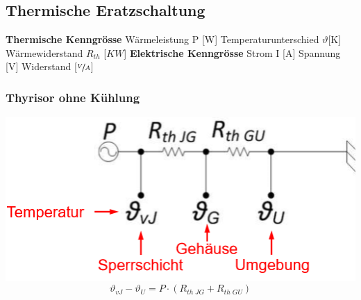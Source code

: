 \subsection{Thermische Eratzschaltung}
\begin{multicols}{3}
    \begin{minipage}{\linewidth}
        \textbf{Thermische Kenngrösse}\newline
        Wärmeleistung P [W]\newline
        Temperaturunterschied $ \vartheta $[K]\newline
        Wärmewiderstand $ R_{th} $ [${K}{W}$]\newline
        \textbf{Elektrische Kenngrösse}\newline
        Strom I  [A]\newline
        Spannung [V]\newline
        Widerstand [$\nicefrac{V}{A}$]\newline
    \end{minipage}

	\begin{minipage}{\linewidth}
		\subsubsection{Thyrisor ohne Kühlung}
		\includegraphics[width=\linewidth]{images/thyrOK}
		\[ \vartheta_{vJ}-\vartheta_U=P \cdot (R_{th\; JG}+R_{th\; GU}) \]		
	\end{minipage}

	\begin{minipage}{\linewidth}

\end{minipage}
\end{multicols}
